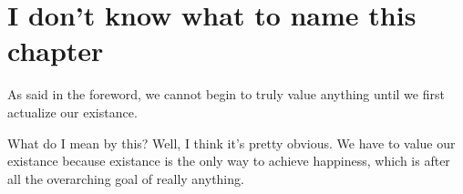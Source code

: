 \chapter{I don't know what to name this chapter}

As said in the foreword, we cannot begin to truly value anything until we first actualize our existance. 

What do I mean by this? Well, I think it's pretty obvious. We have to value our existance because existance
is the only way to achieve happiness, which is after all the overarching goal of really anything.